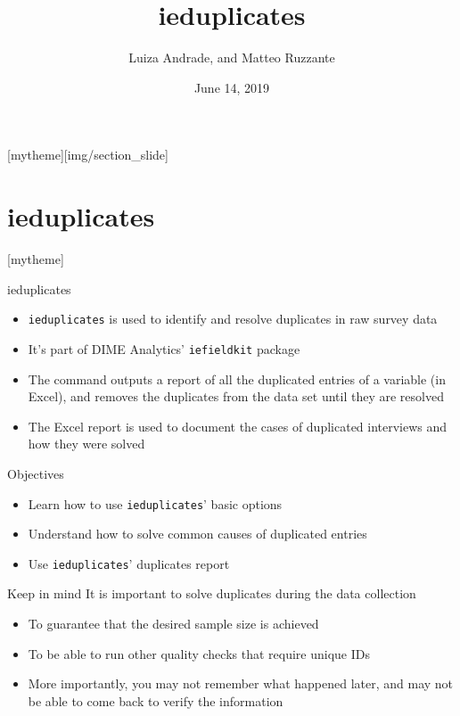 \documentclass[aspectratio=169]{beamer}
\title{ieduplicates}
\date{June 14, 2019}
\author{Luiza Andrade, and Matteo Ruzzante} %
\institute{Development Impact Evaluation (DIME) \newline The World Bank }
\newcommand{\sectionpic}[2]{
	\setbeamertemplate{section page}[mytheme][#2]
	\section{#1}
	\setbeamertemplate{section page}[mytheme]
}
\begin{document}
	
{
\maketitle
}

\sectionpic{ieduplicates}{img/section_slide}

\begin{frame}{ieduplicates}
    \begin{itemize}
        \item \texttt{ieduplicates} is used to identify and resolve duplicates in raw survey data
        \item It's part of DIME Analytics' \texttt{iefieldkit} package
        \item The command outputs a report of all the duplicated entries of a variable (in Excel), and removes the duplicates from the data set until they are resolved
        \item The Excel report is used to document the cases of duplicated interviews and how they were solved
    \end{itemize}
\end{frame}

\begin{frame}{Objectives}
\begin{itemize}
	\item Learn how to use \texttt{ieduplicates}' basic options
	\item Understand how to solve common causes of duplicated entries
	\item Use \texttt{ieduplicates}' duplicates report
\end{itemize}
\end{frame}

\begin{frame}{Keep in mind}
    It is important to solve duplicates during the data collection
    \begin{itemize}
        \item To guarantee that the desired sample size is achieved
        \item To be able to run other quality checks that require unique IDs
        \item More importantly, you may not remember what happened later, and may not be able to come back to verify the information
    \end{itemize}
\end{frame}
\end{document}
